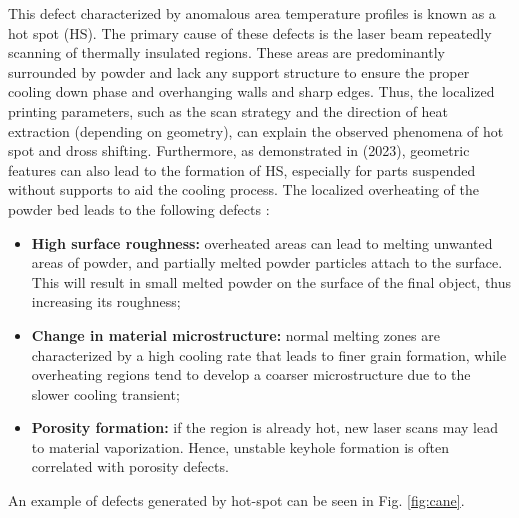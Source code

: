 This defect characterized by anomalous area temperature profiles is known as a hot spot (HS). The primary cause of these defects is the laser beam repeatedly scanning of thermally insulated regions. These areas are predominantly surrounded by powder and lack any support structure to ensure the proper cooling down phase and overhanging walls and sharp edges. Thus, the localized printing parameters, such as the scan strategy and the direction of heat extraction (depending on geometry), can explain the observed phenomena of hot spot and dross shifting. Furthermore, as demonstrated in \citeauthor{moshiri_performance_2023} (2023), geometric features can also lead to the formation of HS, especially for parts suspended without supports to aid the cooling process. The localized overheating of the powder bed leads to the following defects \cite{bugatti_towards_2022}:
\begin{itemize}
    \item \textbf{High surface roughness:} overheated areas can lead to melting unwanted areas of powder, and partially melted powder particles attach to the surface. This will result in small melted powder on the surface of the final object, thus increasing its roughness;
    \item \textbf{Change in material microstructure:} normal melting zones are characterized by a high cooling rate that leads to finer grain formation, while overheating regions tend to develop a coarser microstructure due to the slower cooling transient;
    \item \textbf{Porosity formation:} if the region is already hot, new laser scans may lead to material vaporization. Hence, unstable keyhole formation is often correlated with porosity defects.
\end{itemize} An example of defects generated by hot-spot can be seen in Fig. \ref{fig:cane}.
